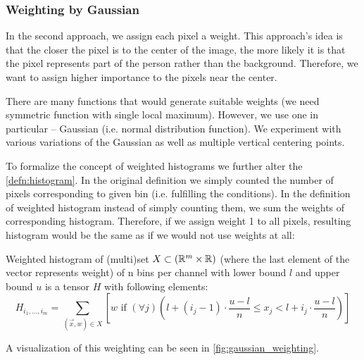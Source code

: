 \subsubsection{Weighting by Gaussian}

In the second approach, we assign each pixel a weight. This approach's idea is that the closer the pixel is to the center of the image, the more likely it is that the pixel represents part of the person rather than the background. Therefore, we want to assign higher importance to the pixels near the center.

There are many functions that would generate suitable weights (we need symmetric
function with single local maximum). However, we use one in particular
-- Gaussian (i.e. normal distribution function). We experiment with various
variations of the Gaussian as well as multiple vertical centering points.


To formalize the concept of weighted histograms we further alter the \autoref{defn:histogram}. In the original definition we simply counted the number of pixels corresponding to given bin (i.e. fulfilling the conditions). In the definition of weighted histogram instead of simply counting them, we sum the weights of corresponding histogram. Therefore, if we assign weight 1 to all pixels, resulting histogram would be the same as if we would not use weights at all:

\begin{defn}
\label{defn:weighted_histogram}
Weighted histogram of (multi)set $X \subset (\mathbb{R}^m \times \mathbb{R})$ (where the last
element of the vector represents weight) of n bins per channel with
lower bound $l$ and upper bound $u$ is a tensor $H$ with following elements:
$$H_{i_1, \ldots, i_m} = \sum_{(\vec{x}, w) \in X} \left[w \text{ if } (\forall j) \left(l + (i_j-1) \cdot \frac{u-l}{n} \leq x_j < l + i_j \cdot \frac{u-l}{n}\right)\right]$$
\end{defn}

A visualization of this weighting can be seen in \autoref{fig:gaussian_weighting}.

